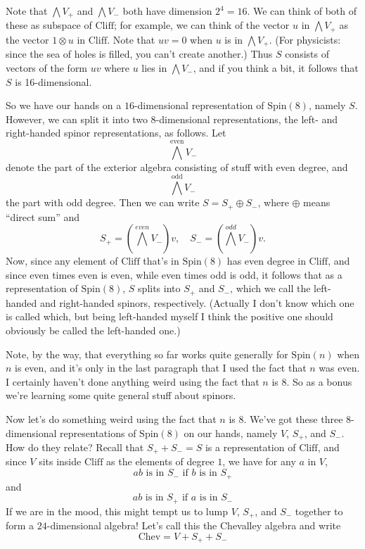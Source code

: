 \documentclass{article}
\begin{document}
Note that \(\bigwedge V_+\) and \(\bigwedge V_-\) both have dimension
\(2^4 = 16\). We can think of both of these as subspace of
\(\mathrm{Cliff}\); for example, we can think of the vector \(u\) in
\(\bigwedge V_+\) as the vector \(1 \otimes u\) in \(\mathrm{Cliff}\).
Note that \(uv = 0\) when \(u\) is in \(\bigwedge V_+\). (For
physicists: since the sea of holes is filled, you can't create another.)
Thus \(S\) consists of vectors of the form \(uv\) where \(u\) lies in
\(\bigwedge V_-\), and if you think a bit, it follows that \(S\) is
16-dimensional.

So we have our hands on a \(16\)-dimensional representation of
\(\mathrm{Spin}(8)\), namely \(S\). However, we can split it into two
\(8\)-dimensional representations, the left- and right-handed spinor
representations, as follows. Let \[\bigwedge^\text{even} V_-\] denote
the part of the exterior algebra consisting of stuff with even degree,
and \[\bigwedge^\text{odd} V_-\] the part with odd degree. Then we can
write \(S = S_+ \oplus S_-\), where \(\oplus\) means ``direct sum'' and
\[S_+ = (\bigwedge^{even} V_-)v , \quad  S_- = (\bigwedge^{odd} V_-)v.\]
Now, since any element of \(\mathrm{Cliff}\) that's in
\(\mathrm{Spin}(8)\) has even degree in \(\mathrm{Cliff}\), and since
even times even is even, while even times odd is odd, it follows that as
a representation of \(\mathrm{Spin}(8)\), \(S\) splits into \(S_+\) and
\(S_-\), which we call the left-handed and right-handed spinors,
respectively. (Actually I don't know which one is called which, but
being left-handed myself I think the positive one should obviously be
called the left-handed one.)

Note, by the way, that everything so far works quite generally for
\(\mathrm{Spin}(n)\) when \(n\) is even, and it's only in the last
paragraph that I used the fact that \(n\) was even. I certainly haven't
done anything weird using the fact that \(n\) is 8. So as a bonus we're
learning some quite general stuff about spinors.

Now let's do something weird using the fact that \(n\) is 8. We've got
these three \(8\)-dimensional representations of \(\mathrm{Spin}(8)\) on
our hands, namely \(V\), \(S_+\), and \(S_-\). How do they relate?
Recall that \(S_+ + S_- = S\) is a representation of \(\mathrm{Cliff}\),
and since \(V\) sits inside \(\mathrm{Cliff}\) as the elements of degree
\(1\), we have for any \(a\) in \(V\),
\[\mbox{$ab$ is in $S_-$ if $b$ is in $S_+$}\] and
\[\mbox{$ab$ is in $S_+$ if $a$ is in $S_-$}\] If we are in the mood,
this might tempt us to lump \(V\), \(S_+\), and \(S_-\) together to form
a \(24\)-dimensional algebra! Let's call this the Chevalley algebra and
write \[\mathrm{Chev} = V + S_+ + S_-\]
\end{document}
